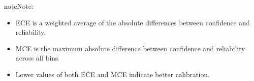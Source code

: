 \documentclass[letterpaper,10pt,english]{sphinxmanual}
\begin{document}
\begin{fulllineitems}
\begin{sphinxadmonition}{note}{Note:}\begin{itemize}
\item {} 
\sphinxAtStartPar
ECE is a weighted average of the absolute differences between confidence and reliability.

\item {} 
\sphinxAtStartPar
MCE is the maximum absolute difference between confidence and reliability across all bins.

\item {} 
\sphinxAtStartPar
Lower values of both ECE and MCE indicate better calibration.

\end{itemize}
\end{sphinxadmonition}

\end{fulllineitems}

\end{document}
